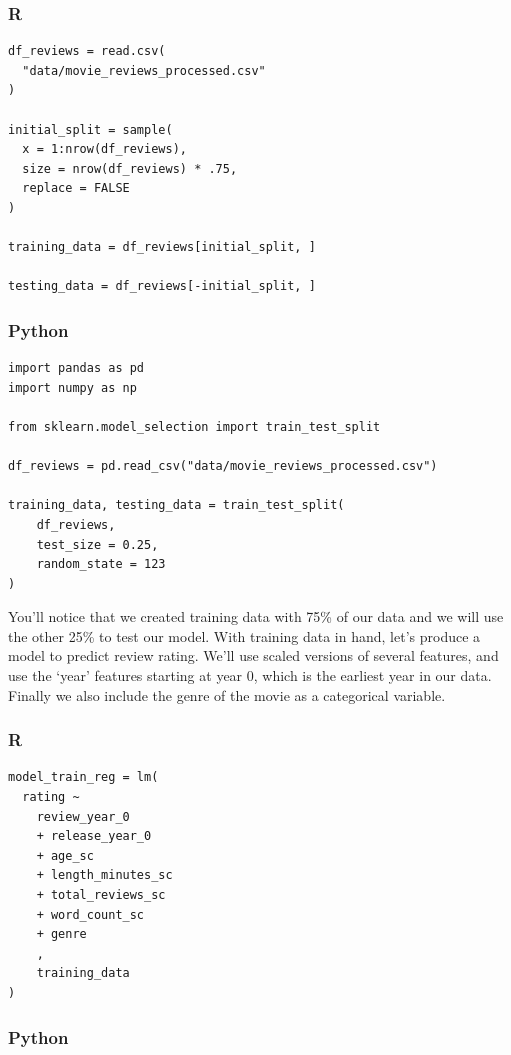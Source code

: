 \documentclass[
  letterpaper,
]{krantz}
\begin{document}
\subsubsection{R}

\begin{verbatim}
df_reviews = read.csv(
  "data/movie_reviews_processed.csv"
)

initial_split = sample(
  x = 1:nrow(df_reviews), 
  size = nrow(df_reviews) * .75, 
  replace = FALSE
)

training_data = df_reviews[initial_split, ]

testing_data = df_reviews[-initial_split, ]
\end{verbatim}

\subsubsection{Python}

\begin{verbatim}
import pandas as pd
import numpy as np

from sklearn.model_selection import train_test_split

df_reviews = pd.read_csv("data/movie_reviews_processed.csv")

training_data, testing_data = train_test_split(
    df_reviews, 
    test_size = 0.25, 
    random_state = 123
)
\end{verbatim}

You'll notice that we created training data with 75\% of our data and we
will use the other 25\% to test our model. With training data in hand,
let's produce a model to predict review rating. We'll use scaled
versions of several features, and use the `year' features starting at
year 0, which is the earliest year in our data. Finally we also include
the genre of the movie as a categorical variable.

\subsubsection{R}

\begin{verbatim}
model_train_reg = lm(
  rating ~ 
    review_year_0 
    + release_year_0 
    + age_sc 
    + length_minutes_sc 
    + total_reviews_sc 
    + word_count_sc 
    + genre 
    ,
    training_data
)
\end{verbatim}

\subsubsection{Python}
\end{document}
